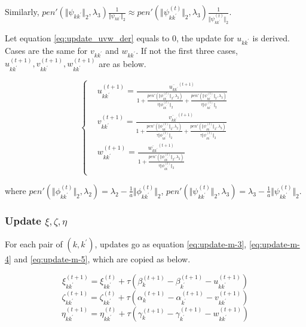 \documentclass[12pt, a4paper, oneside]{article}
\numberwithin{equation}{section}
\begin{document}
Similarly, $pen'(\Vert\psi_{k{k^\prime}}\Vert_2, \lambda_3)\frac{1}{\Vert\psi_{k{k^\prime}}\Vert_2} \approx pen'(\Vert\psi^{(t)}_{k{k^\prime}}\Vert_2, \lambda_3)\frac{1}{\Vert\psi^{(t)}_{k{k^\prime}}\Vert_2}$. 

Let equation \ref{eq:update_uvw_der} equals to 0, the update for $u_{k{k^\prime}}$ is derived. Cases are the same for $v_{k{k^\prime}}$ and $w_{k{k^\prime}}$. If not the first three cases, $u^{(t+1)}_{k{k^\prime}}, v^{(t+1)}_{k{k^\prime}}, w^{(t+1)}_{k{k^\prime}}$ are as below.

\begin{equation}
\label{eq:update-uvw-case4-final}
\left\{
\begin{aligned}
& u_{k{k^\prime}}^{(t+1)} = \frac{\overline{u_{k{k^\prime}}}^{(t+1)}}{1+\frac{pen'(\Vert\phi^{(t)}_{k{k^\prime}}\Vert_2, \lambda_2)}{\tau\Vert\phi^{(t)}_{k{k^\prime}}\Vert_2} + \frac{pen'(\Vert\psi^{(t)}_{k{k^\prime}}\Vert_2, \lambda_3)}{\tau\Vert\psi^{(t)}_{k{k^\prime}}\Vert_2}} \\
& v_{k{k^\prime}}^{(t+1)} = \frac{\overline{v_{k{k^\prime}}}^{(t+1)}}{1+\frac{pen'(\Vert\phi^{(t)}_{k{k^\prime}}\Vert_2, \lambda_2)}{\tau\Vert\phi^{(t)}_{k{k^\prime}}\Vert_2} + \frac{pen'(\Vert\psi^{(t)}_{k{k^\prime}}\Vert_2, \lambda_3)}{\tau\Vert\psi^{(t)}_{k{k^\prime}}\Vert_2}} \\
& w_{k{k^\prime}}^{(t+1)} = \frac{\overline{w_{k{k^\prime}}}^{(t+1)}}{1+\frac{pen'(\Vert\phi^{(t)}_{k{k^\prime}}\Vert_2, \lambda_2)}{\tau\Vert\phi^{(t)}_{k{k^\prime}}\Vert_2}} \\
\end{aligned}
\right.
\end{equation}

where $pen'(\Vert\phi^{(t)}_{k{k^\prime}}\Vert_2, \lambda_2) = \lambda_2 - \frac{1}{a} \Vert\phi^{(t)}_{k{k^\prime}}\Vert_2$, $pen'(\Vert\psi^{(t)}_{k{k^\prime}}\Vert_2, \lambda_3) = \lambda_3 - \frac{1}{a} \Vert\psi^{(t)}_{k{k^\prime}}\Vert_2$.

\subsubsection{Update $\xi, \zeta, \eta$}
For each pair of $(k, k^\prime)$, updates go as equation \ref{eq:update-m-3}, \ref{eq:update-m-4} and \ref{eq:update-m-5}, which are copied as below.

\begin{equation}
	\xi_{k{k^\prime}}^{(t+1)}=\xi_{k{k^\prime}}^{(t)}+\tau\left(\beta_{k}^{(t+1)}-\beta_{k^\prime}^{(t+1)}-u_{k{k^\prime}}^{(t+1)}\right)
\end{equation}
\begin{equation}
	\zeta_{k{k^\prime}}^{(t+1)}=\zeta_{k{k^\prime}}^{(t)}+\tau\left(\alpha_{k}^{(t+1)}-\alpha_{k^\prime}^{(t+1)}-v_{k{k^\prime}}^{(t+1)}\right)
\end{equation}
\begin{equation}
	\eta_{k{k^\prime}}^{(t+1)}=\eta_{k{k^\prime}}^{(t)}+\tau\left(\gamma_{k}^{(t+1)}-\gamma_{k^\prime}^{(t+1)}-w_{k{k^\prime}}^{(t+1)}\right)
\end{equation}
\end{document}
